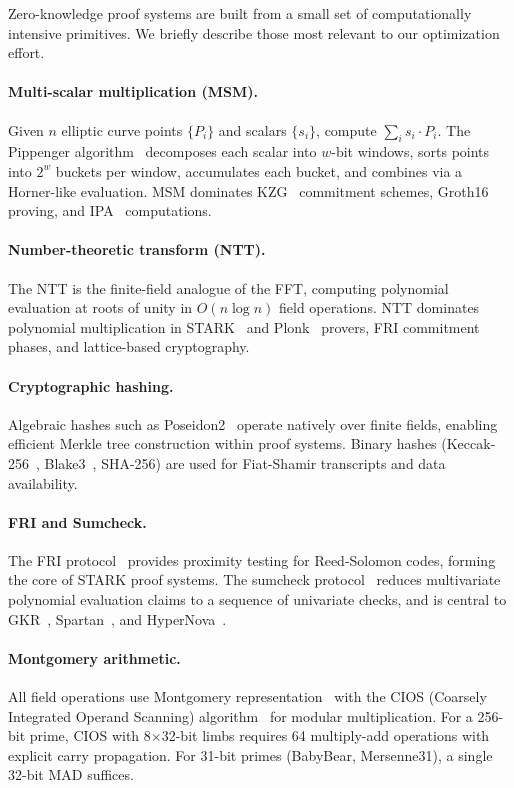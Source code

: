 \documentclass[letterpaper,twocolumn,10pt]{article}
\begin{document}
Zero-knowledge proof systems are built from a small set of computationally
intensive primitives. We briefly describe those most relevant to our
optimization effort.

\paragraph{Multi-scalar multiplication (MSM).} Given $n$ elliptic curve
points $\{P_i\}$ and scalars $\{s_i\}$, compute $\sum_i s_i \cdot P_i$.
The Pippenger algorithm~\cite{pippenger} decomposes each scalar into
$w$-bit windows, sorts points into $2^w$ buckets per window, accumulates
each bucket, and combines via a Horner-like evaluation. MSM dominates
KZG~\cite{kzg} commitment schemes, Groth16~\cite{groth16} proving, and
IPA~\cite{bulletproofs} computations.

\paragraph{Number-theoretic transform (NTT).} The NTT is the
finite-field analogue of the FFT, computing polynomial evaluation at
roots of unity in $O(n \log n)$ field operations. NTT dominates polynomial
multiplication in STARK~\cite{stark} and Plonk~\cite{plonk} provers, FRI
commitment phases, and lattice-based cryptography.

\paragraph{Cryptographic hashing.} Algebraic hashes such as
Poseidon2~\cite{poseidon2} operate natively over finite fields, enabling
efficient Merkle tree construction within proof systems. Binary hashes
(Keccak-256~\cite{keccak}, Blake3~\cite{blake3}, SHA-256) are used for
Fiat-Shamir transcripts and data availability.

\paragraph{FRI and Sumcheck.} The FRI protocol~\cite{fri} provides
proximity testing for Reed-Solomon codes, forming the core of STARK proof
systems. The sumcheck protocol~\cite{sumcheck} reduces multivariate
polynomial evaluation claims to a sequence of univariate checks, and is
central to GKR~\cite{gkr}, Spartan~\cite{spartan}, and
HyperNova~\cite{hypernova}.

\paragraph{Montgomery arithmetic.} All field operations use Montgomery
representation~\cite{montgomery} with the CIOS (Coarsely Integrated
Operand Scanning) algorithm~\cite{cios} for modular multiplication. For a
256-bit prime, CIOS with 8$\times$32-bit limbs requires 64 multiply-add
operations with explicit carry propagation. For 31-bit primes (BabyBear,
Mersenne31), a single 32-bit MAD suffices.
\end{document}
